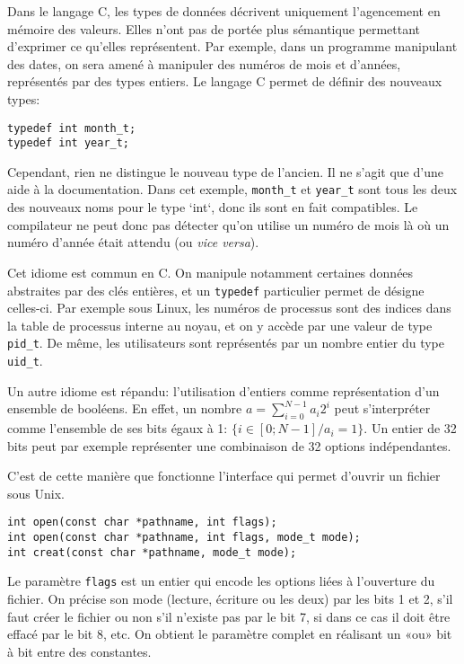 \def\tBits{\textsc{Bits}\xspace}
\def\tChar{\textsc{Char}\xspace}

Dans le langage C, les types de données décrivent uniquement l'agencement en
mémoire des valeurs. Elles n'ont pas de portée plus sémantique permettant
d'exprimer ce qu'elles représentent. Par exemple, dans un programme manipulant
des dates, on sera amené à manipuler des numéros de mois et d'années,
représentés par des types entiers. Le langage C permet de définir des nouveaux
types:

\begin{verbatim}
typedef int month_t;
typedef int year_t;
\end{verbatim}

Cependant, rien ne distingue le nouveau type de l'ancien. Il ne s'agit que d'une
aide à la documentation. Dans cet exemple, \texttt{month\_t} et \texttt{year\_t}
sont tous les deux des nouveaux noms pour le type `int`, donc ils sont en fait
compatibles. Le compilateur ne peut donc pas détecter qu'on utilise un numéro de
mois là où un numéro d'année était attendu (ou \emph{vice versa}).

Cet idiome est commun en C. On manipule notamment certaines données abstraites
par des clés entières, et un \texttt{typedef} particulier permet de désigne
celles-ci. Par exemple sous Linux, les numéros de processus sont des indices
dans la table de processus interne au noyau, et on y accède par une valeur de
type \texttt{pid\_t}. De même, les utilisateurs sont représentés par un nombre
entier du type \texttt{uid\_t}.

Un autre idiome est répandu: l'utilisation d'entiers comme représentation d'un
ensemble de booléens. En effet, un nombre $a = \sum_{i=0}^{N-1} a_i 2^i$ peut
s'interpréter comme l'ensemble de ses bits égaux à 1: $\{ i ∈ [0;N-1] / a_i = 1
\}$. Un entier de 32 bits peut par exemple représenter une combinaison de 32
options indépendantes.

C'est de cette manière que fonctionne l'interface qui permet d'ouvrir un fichier
sous Unix.

\begin{verbatim}
int open(const char *pathname, int flags);
int open(const char *pathname, int flags, mode_t mode);
int creat(const char *pathname, mode_t mode);
\end{verbatim}

Le paramètre \texttt{flags} est un entier qui encode les options liées à
l'ouverture du fichier. On précise son mode (lecture, écriture ou les deux) par
les bits 1 et 2, s'il faut créer le fichier ou non s'il n'existe pas par le bit
7, si dans ce cas il doit être effacé par le bit 8, etc. On obtient le paramètre
complet en réalisant un «ou» bit à bit entre des constantes.


